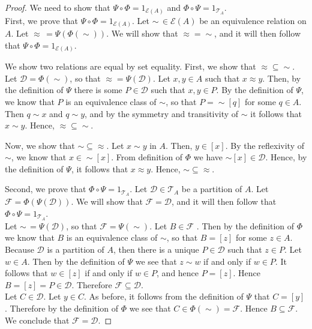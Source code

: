 \documentclass[a4paper,english,12pt]{article}
\begin{document}
\begin{proof} We need to show that $\Psi \circ \Phi = 1_{\mathcal{E}(A)}$ and $\Phi \circ \Psi = 1_{\mathcal{T}_A}$.\\
First, we prove that $\Psi \circ \Phi = 1_{\mathcal{E}(A)}$. Let $\sim \, \in \mathcal{E}(A)$ be an equivalence relation on $A$. Let $\approx \, = \Psi(\Phi(\sim))$. We will show that $\approx = \sim$, and it will then follow that $\Psi \circ \Phi = 1_{\mathcal{E}(A)}$. 

We show two relations are equal by set equality. First, we show that $\approx \subseteq \sim$. Let $\mathcal{D} = \Phi(\sim)$, so that $\approx  = \Psi(\mathcal{D})$.	Let $x,y \in A$ such that $x \approx y$. Then, by the definition of $\Psi$ there is some $P \in \mathcal{D}$ such that $x,y \in P$. By the definition of $\Psi$, we know that $P$ is an equivalence class of $\sim$, so that $P = \sim[q]$ for some $q \in A.$ Then $q \sim x$ and $q \sim y$, and by the symmetry and transitivity of $\sim$ it follows that $x \sim y$. Hence, ${\approx} \subseteq {\sim}$.

Now, we show that $\sim \subseteq \approx$. Let $x \sim y$ in $A$. Then, $y \in [x]$. By the reflexivity of $\sim$, we know that $x \in \sim[x]$. From definition of $\Phi$ we have $\sim[x] \in \mathcal{D}$. Hence, by the definition of $\Psi$, it follows that $x \approx y$. Hence, ${\sim} \subseteq {\approx}$.
	
Second, we prove that $\Phi \circ \Psi = 1_{\mathcal{T}_A}$. Let $\mathcal{D} \in \mathcal{T}_A$ be a partition of $A$. Let $\mathcal{F} = \Phi(\Psi(\mathcal{D}))$. We will show that $\mathcal{F} = \mathcal{D}$, and it will then follow that $\Phi \circ \Psi = 1_{\mathcal{T}_A}$. \\
	Let $\sim \, = \Psi(\mathcal{D})$, so that $\mathcal{F} = \Psi(\sim)$. Let $B \in \mathcal{F}$ . Then by the definition of $\Phi$ we know that $B$ is an equivalence class of $\sim$, so that $B = [z]$ for some $z \in A$. Because $\mathcal{D}$ is a partition of $A$, then there is a unique $P \in \mathcal{D}$ such that $z \in P$. Let $w \in A$. Then by the definition of $\Psi$ we see that $z \sim w$ if and only if $w \in P$. It follows that $w \in [z]$ if and only if $w \in P$, and hence $P = [z]$. Hence $B = [z] = P \in \mathcal{D}$. Therefore $\mathcal{F} \subseteq \mathcal{D}$.\\
	Let $C \in \mathcal{D}$. Let $y \in C$. As before, it follows from the definition of $\Psi$ that $C = [y]$. Therefore by the definition of $\Phi$ we see that $C \in \Phi(\sim) = \mathcal{F}$. Hence $B \subseteq \mathcal{F}$. We conclude that $\mathcal{F} = \mathcal{D}$.
\end{proof}






	
\end{document}
